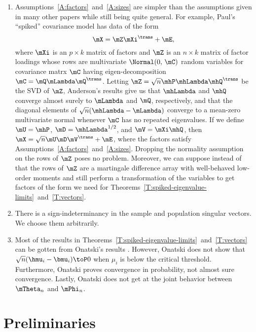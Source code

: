 \begin{enumerate}
    
\item
Assumptions~\ref{A:factors}~and~\ref{A:sizes} are simpler than the assumptions given in many other papers while still being quite general.  For example, Paul's ``spiked'' covariance model has data of the form
\[
    \mX = \mZ \mXi^\trans + \mE,
\]
where $\mXi$ is an $p \times k$ matrix of factors and $\mZ$ is an $n\times k$ matrix of factor loadings whose rows are \iid multivariate $\Normal(0,\, \mC)$ random variables for covariance matrx $\mC$ having eigen-decomposition $\mC = \mQ \mLambda \mQ^\trans$.  Letting $\mZ = \sqrt{n} \mhP \mhLambda \mhQ^\trans$ be the SVD of $\mZ$, Anderson's results \cite{anderson1963atp} give us that $\mhLambda$ and $\mhQ$ converge almost surely to $\mLambda$ and $\mQ$, respectively, and that the diagonal elements of $\sqrt{n} (\mhLambda - \mLambda)$ converge to a mean-zero multivariate normal whenever $\mC$ has no repeated eigenvalues.  If we define $\mU = \mhP$, $\mD = \mhLambda^{1/2}$, and $\mV = \mXi \mhQ$, then $\mX = \sqrt{n} \mU \mD \mV^\trans + \mE$, where the factors satisfy Assumptions~\ref{A:factors}~and~\ref{A:sizes}.  Dropping the normality assumption on the rows of $\mZ$ poses no problem.  Moreover, we can suppose instead of \iid that the rows of $\mZ$ are a martingale difference array with well-behaved low-order moments and still perform a transformation of the variables to get factors of the form we need for Theorems~\ref{T:spiked-eigenvalue-limits}~and~\ref{T:vectors}.

\item
There is a sign-indeterminancy in the sample and population singular vectors. We choose them arbitrarily.

\item 
Most of the results in Theorems~\ref{T:spiked-eigenvalue-limits}~and~\ref{T:vectors} can be gotten from Onatski's results \cite{onatski2009}.   However, Onatski does not show that $\sqrt{n} (\hmu_i - \bmu_i) \toP 0$ when $\mu_i$ is below the critical threshold.  Furthermore, Onatski proves convergence in probability, not almost sure convergence.  Lastly, Onatski does not get at the joint behavior between $\mTheta_n$ and $\mPhi_n$.

\end{enumerate}

\section{Preliminaries}\label{S:lowrank-preliminaries}


